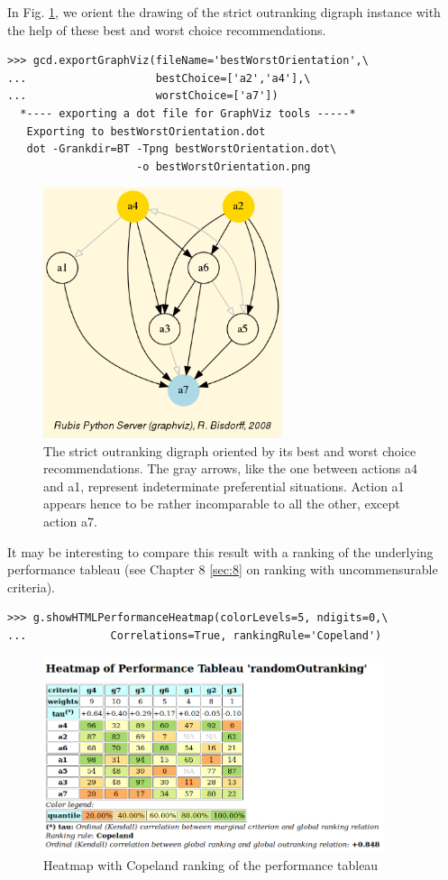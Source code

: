 In Fig. \ref{fig:17.8}, we orient the drawing of the strict outranking digraph instance with the help of these best and worst choice recommendations. 
\begin{lstlisting}
>>> gcd.exportGraphViz(fileName='bestWorstOrientation',\
...                    bestChoice=['a2','a4'],\
...                    worstChoice=['a7'])
  *---- exporting a dot file for GraphViz tools -----*
   Exporting to bestWorstOrientation.dot
   dot -Grankdir=BT -Tpng bestWorstOrientation.dot\
                    -o bestWorstOrientation.png
\end{lstlisting}
\begin{figure}[h]
\sidecaption
\includegraphics[width=7cm]{Figures/bestWorstOrientation.png}
\caption{The strict outranking digraph oriented by its best and worst choice recommendations. The gray arrows, like the one between actions a4 and a1, represent indeterminate preferential situations. Action a1 appears hence to be rather incomparable to all the other, except action a7.}
\label{fig:17.8}       %
\end{figure}

It may be interesting to compare this result with a \Copeland ranking of the underlying performance tableau (see Chapter 8 \ref{sec:8} on ranking with uncommensurable criteria).
\begin{lstlisting}
>>> g.showHTMLPerformanceHeatmap(colorLevels=5, ndigits=0,\
...             Correlations=True, rankingRule='Copeland')
\end{lstlisting}
\begin{figure}[h]
\includegraphics[width=10cm]{Figures/outRankingResult.png}
\caption{Heatmap with Copeland ranking of the performance tableau}
\label{fig:17.9}       %
\end{figure}

